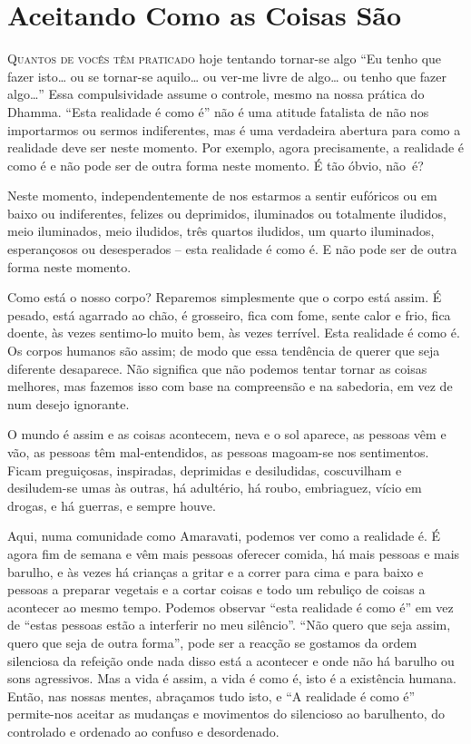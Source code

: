 \chapter{Aceitando Como as Coisas São}

\lettrine{Q}{uantos de vocês têm praticado} hoje tentando tornar-se algo ``Eu tenho que fazer
isto\ldots{} ou se tornar-se aquilo\ldots{} ou ver-me livre de algo\ldots{} ou
tenho que fazer algo\ldots{}'' Essa compulsividade assume o controle, mesmo na
nossa prática do Dhamma. ``Esta realidade é como é'' não é uma atitude fatalista
de não nos importarmos ou sermos indiferentes, mas é uma verdadeira abertura
para como a realidade deve ser neste momento. Por exemplo, agora precisamente, a
realidade é como é e não pode ser de outra forma neste momento. É tão óbvio,
não~é?

Neste momento, independentemente de nos estarmos a sentir eufóricos ou em baixo
ou indiferentes, felizes ou deprimidos, iluminados ou totalmente iludidos, meio
iluminados, meio iludidos, três quartos iludidos, um quarto iluminados,
esperançosos ou desesperados -- esta realidade é como é. E não pode ser de outra
forma neste momento.

Como está o nosso corpo? Reparemos simplesmente que o corpo está assim. É
pesado, está agarrado ao chão, é grosseiro, fica com fome, sente calor e frio,
fica doente, às vezes sentimo-lo muito bem, às vezes terrível. Esta realidade é
como é. Os corpos humanos são assim; de modo que essa tendência de querer que
seja diferente desaparece. Não significa que não podemos tentar tornar as coisas
melhores, mas fazemos isso com base na compreensão e na sabedoria, em vez de num
desejo ignorante.

O mundo é assim e as coisas acontecem, neva e o sol aparece, as pessoas vêm e
vão, as pessoas têm mal-entendidos, as pessoas magoam-se nos sentimentos. Ficam
preguiçosas, inspiradas, deprimidas e desiludidas, coscuvilham e desiludem-se
umas às outras, há adultério, há roubo, embriaguez, vício em drogas, e há
guerras, e sempre houve.

Aqui, numa comunidade como Amaravati, podemos ver como a realidade é. É agora
fim de semana e vêm mais pessoas oferecer comida, há mais pessoas e mais
barulho, e às vezes há crianças a gritar e a correr para cima e para baixo e
pessoas a preparar vegetais e a cortar coisas e todo um rebuliço de coisas a
acontecer ao mesmo tempo. Podemos observar ``esta realidade é como é'' em vez de
``estas pessoas estão a interferir no meu silêncio''. ``Não quero que seja
assim, quero que seja de outra forma'', pode ser a reacção se gostamos da ordem
silenciosa da refeição onde nada disso está a acontecer e onde não há barulho ou
sons agressivos. Mas a vida é assim, a vida é como é, isto é a existência
humana. Então, nas nossas mentes, abraçamos tudo isto, e ``A realidade é como
é'' permite-nos aceitar as mudanças e movimentos do silencioso ao barulhento, do
controlado e ordenado ao confuso e desordenado.

